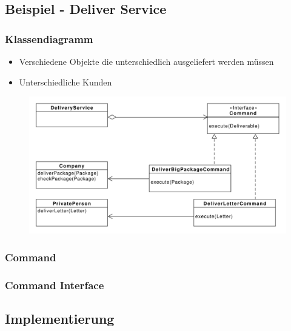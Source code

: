 \subsection{Beispiel - Deliver Service}
\begin{frame}
	\frametitle{Klassendiagramm}
	\begin{itemize}
		\item Verschiedene Objekte die unterschiedlich ausgeliefert werden müssen
		\item Unterschiedliche Kunden
	\end{itemize}	
	
  	\begin{figure}
		\includegraphics[scale=.4]{paper/command/DeliverService}
	\end{figure}
\end{frame}


\begin{frame}
	\frametitle{Command}
  	\begin{figure}
	\end{figure}
\end{frame}

\begin{frame}
	\frametitle{Command Interface}
  	\begin{figure}
	\end{figure}
\end{frame}

\subsection{Implementierung}

